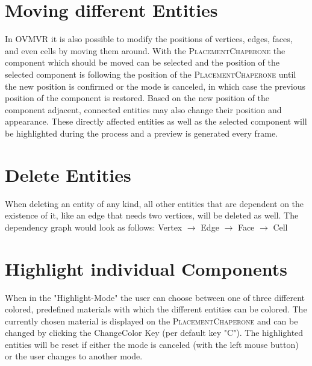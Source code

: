 \documentclass{report}
\begin{document}
	\section{Moving different Entities}
	\startsection
		In OVMVR it is also possible to modify the positions of vertices, edges, faces, and even cells by moving them around. With the \textsc{PlacementChaperone} the component which should be moved can be selected and the position of the selected component is following the position of the \textsc{PlacementChaperone} until the new position is confirmed or the mode is canceled, in which case the previous position of the component is restored. Based on the new position of the component adjacent, connected entities may also change their position and appearance. These directly affected entities as well as the selected component will be highlighted during the process and a preview is generated every frame.
	\closesection
	
	\section{Delete Entities}
	\startsection
		When deleting an entity of any kind, all other entities that are dependent on the existence of it, like an edge that needs two vertices, will be deleted as well. The dependency graph would look as follows:
		\startsubsection
			Vertex $\rightarrow$ Edge $\rightarrow$ Face $\rightarrow$ Cell
		\closesection
	\closesection
	
	\section{Highlight individual Components}
	\startsection
		When in the "Highlight-Mode" the user can choose between one of three different colored, predefined materials with which the different entities can be colored. The currently chosen material is displayed on the \textsc{PlacementChaperone} and can be changed by clicking the ChangeColor Key (per default key "C"). The highlighted entities will be reset if either the mode is canceled (with the left mouse button) or the user changes to another mode.
	\closesection
	
\end{document}
